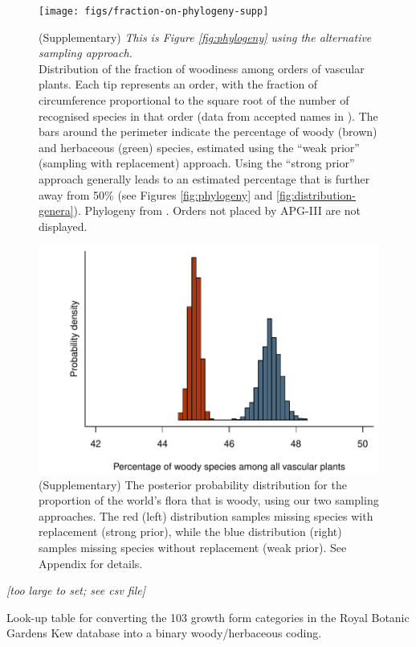 \documentclass[a4paper,12pt]{article}
\begin{document}
\begin{figure}[p]
  \centering
  \texttt{[image: figs/fraction-on-phylogeny-supp]}

  \caption{(Supplementary)
    \textit{This is Figure \ref{fig:phylogeny} using the alternative
      sampling approach.}\\
    Distribution of the fraction of woodiness among orders of vascular
    plants.  Each tip represents an order, with the fraction of
    circumference proportional to the square root of the number of
    recognised species in that order (data from accepted names in
    \citet{ThePlantList}).  The bars around the perimeter indicate the
    percentage of woody (brown) and herbaceous (green) species,
    estimated using the ``weak prior'' (sampling with replacement)
    approach.  Using the ``strong prior'' approach generally leads to
    an estimated percentage that is further away from 50\% (see
    Figures \ref{fig:phylogeny} and \ref{fig:distribution-genera}).
    Phylogeny from \citep{Zanne}.  Orders not placed by APG-III
    \citep{APG3} are not displayed.}
  \label{fig:phylogeny-supp}
\end{figure}

\begin{figure}[p]
  \centering
  \includegraphics{figs/distribution-raw}  
  \caption{(Supplementary) The posterior probability distribution for
    the proportion of the world's flora that is woody, using our two
    sampling approaches.  The red (left) distribution samples missing species
    with replacement (strong prior), while the blue distribution
    (right) samples missing species without replacement (weak prior).
    See Appendix for details.}
  \label{fig:distribution-raw}
\end{figure}

\begin{table}[p]
  \centering
  \textit{[too large to set; see csv file]}
  \caption{Look-up table for converting the 103 growth form categories
    in the Royal Botanic Gardens Kew database into a binary
woody/herbaceous coding.}
\label{tab:kew}
\end{table}
\end{document}
